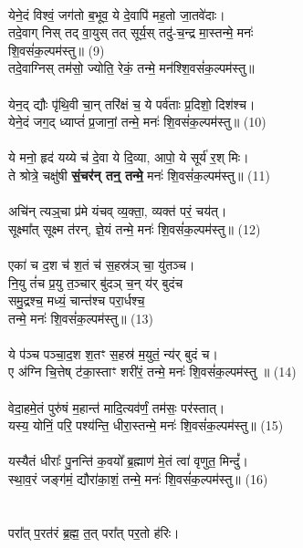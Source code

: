 \\
येने॒दं विश्वं॒ जग॑तो ब॒भूव॒ ये दे॒वापि॑ मह॒तो जा॒तवे॑दाः।\\
तदे॒वाग् निस् तद् वा॒युस् तत् सूर्य॒स् तदु॑-च॒न्द्र मा॒स्तन्मे॒ मनः॑\\
 शि॒वसं॑क॒ल्पम॑स्तु॥ (9)\\
{\small तदे॒वाग्निस् तम॑सो॒ ज्योति॒ रेकं॒ तन्मे॒ मन॑श्शि॒वसं॑क॒ल्पम॑स्तु॥}\\
\\
येन॒द् द्यौः पृ॑थि॒वी चा॒न् तरि॑क्षं च॒ ये पर्व॑ताः प्र॒दिशो॒ दिश॑श्च। \\
येने॒दं जग॒द् ध्याप्तं॑ प्र॒जानां॒ तन्मे॒ मनः॑ शि॒वसं॑क॒ल्पम॑स्तु॥ (10)\\
\\
ये मनो॒ हृद॑ यय्ये च॑ दे॒वा ये दि॒व्या, आपो॒ ये सूर्य॑ र॒श् मिः। \\
ते श्रोत्रे॒ चक्षु॑षी \textbf{सं॒चर॑न् तन्॒ तन्मे॒} मनः॑ शि॒वसं॑क॒ल्पम॑स्तु॥ (11)\\
\\
अचि॑न् त्यञ्॒चा प्र॑मे यंचव् व्य॒क्ता॒, व्यक्त॑ परं॒ चय॑त्। \\
सूक्ष्मा᳚त् सूक्ष्म त॑रन्, ज्ञे॒यं तन्मे॒ मनः॑ शि॒वसं॑क॒ल्पम॑स्तु॥ (12)\\
\\
एका॑ च द॒श च॑ श॒तं च॑ स॒हस्र॑ञ् चा॒ यु॑तञ्च। \\
नि॒यु तं॑च प्र॒यु त॒ञ्चार् बु॑दञ् च॒न् य॑र् बुदंच \\
{\small समु॒द्रश्च॒ मध्यं॒ चान्त॑श्च परा॒र्धश्च॒}\\
तन्मे॒ मनः॑ शि॒वसं॑क॒ल्पम॑स्तु॥ (13)\\
\\
ये प॑ञ्च पञ्चा॒द॒श श॒तꣳ स॒हस्र॑ म॒युतं॒ न्य॑र् बुदं च। \\
ए अ॑ग्नि चि॒त्तेष् ट॑का॒स्ताꣳ शरी॑रं॒ तन्मे॒ मनः॑ शि॒वसं॑क॒ल्पम॑स्तु ॥ (14)\\
\\
वेदा॒हमे॒तं पुरु॑षं म॒हान्त॑ मादि॒त्यव॑र्णं॒ तम॑सः॒ पर॑स्तात्। \\
यस्य॒ योनिं॒ परि॒ पश्य॑न्ति॒ धीरा॒स्तन्मे॒ मनः॑ शि॒वसं॑क॒ल्पम॑स्तु॥ (15)\\
\\
यस्यैतं धीराः᳚ पु॒नन्ति॑ क॒वयो᳚ ब्र॒ह्माण॑ मे॒तं त्वा॑ वृणुत॒ मिन्दुं᳚। \\
स्था॒व॒रं जङ्ग॑मं॒ द्यौरा॑का॒शं॒ तन्मे॒ मनः॑ शि॒वसं॑क॒ल्पम॑स्तु॥ (16)\\
\\
{\small {}}\\
परा᳚त् प॒रत॑रं ब्र॒ह्म॒ त॒त् परा᳚त् पर॒तो ह॑रिः। \\
